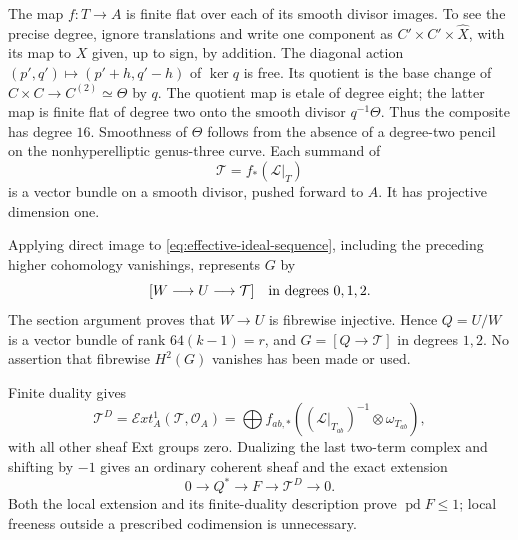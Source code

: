 The map $f:T\to A$ is finite flat over each of its smooth divisor
images. To see the precise degree, ignore translations and write
one component as $C'\times C'\times\widehat X$, with its map to
$X$ given, up to sign, by addition. The diagonal action
$(p',q')\mapsto(p'+h,q'-h)$ of $\ker q$ is free. Its quotient is
the base change of $C\times C\to C^{(2)}\simeq\Theta$ by $q$.
The quotient map is etale of degree eight; the latter map is
finite flat of degree two onto the smooth divisor $q^{-1}\Theta$.
Thus the composite has degree $16$. Smoothness of $\Theta$ follows
from the absence of a degree-two pencil on the nonhyperelliptic
genus-three curve. Each summand of
\[
 \mathcal T=f_*(\mathcal L|_T)
\]
is a vector bundle on a smooth divisor, pushed forward to $A$.
It has projective dimension one.

Applying direct image to \eqref{eq:effective-ideal-sequence}, including the preceding higher
cohomology vanishings, represents $G$ by
\begin{equation}\label{eq:effective-three-terms}
 [W\longrightarrow U\longrightarrow\mathcal T]
 \quad\hbox{in degrees }0,1,2.                            
\end{equation}
The section argument proves that $W\to U$ is fibrewise injective.
Hence $Q=U/W$ is a vector bundle of rank $64(k-1)=r$, and
$G=[Q\to\mathcal T]$ in degrees $1,2$. No assertion that fibrewise
$H^2(G)$ vanishes has been made or used.

Finite duality gives
\[
 \mathcal T^D=\mathcal E xt^1_A(\mathcal T,\mathcal O_A)
 =\bigoplus f_{ab,*}
       ((\mathcal L|_{T_{ab}})^{-1}\otimes\omega_{T_{ab}}),
\]
with all other sheaf Ext groups zero. Dualizing the last two-term
complex and shifting by $-1$ gives an ordinary coherent sheaf and
the exact extension
\begin{equation}\label{eq:effective-extension}
 0\longrightarrow Q^*\longrightarrow F
   \longrightarrow\mathcal T^D\longrightarrow0.          
\end{equation}
Both the local extension and its finite-duality description prove
$\operatorname{pd}F\le1$; local freeness outside a prescribed
codimension is unnecessary.

